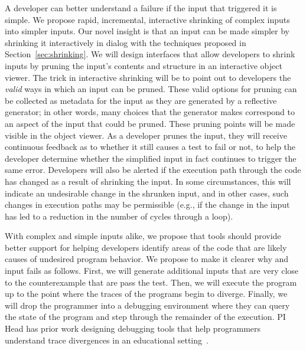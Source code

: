A developer can better understand a failure if the input
that triggered it is simple. We propose rapid, incremental,
interactive shrinking of complex inputs into simpler inputs.
Our novel insight is that an input can be made simpler by
shrinking it interactively in dialog with the techniques
proposed in Section~\ref{sec:shrinking}. We will design
interfaces that allow developers to shrink inputs by pruning
the input's contents and structure in an interactive object
viewer. The trick in interactive shrinking will be to point
out to developers the \emph{valid} ways in which an input
can be pruned. These valid options for pruning can be
collected as metadata for the input as they are generated by
a reflective generator; in other words, many choices that
the generator makes correspond to an aspect of the input
that could be pruned. These pruning points will be made
visible in the object viewer. As a developer prunes the
input, they will receive continuous feedback as to whether
it still causes a test to fail or not, to help the developer
determine whether the simplified input in fact continues to
trigger the same error. Developers will also be alerted if
the execution path through the code has changed as a result
of shrinking the input. In some circumstances, this will
indicate an undesirable change in the shrunken input, and in
other cases, such changes in execution paths may be
permissible (e.g., if the change in the input has led to a
reduction in the number of cycles through a loop).

With complex and simple inputs alike, we propose that tools
should provide better support for helping developers
identify areas of the code that are likely causes of
undesired program behavior. We propose to make it clearer
why and input fails as follows. First, we will generate
additional inputs that are very close to the counterexample
that are pass the test. Then, we will execute the program up
to the point where the traces of the programs begin to
diverge. Finally, we will drop the programmer into a
debugging environment where they can query the state of the
program and step through the remainder of the execution. PI
Head has prior work designing debugging tools that help
programmers understand trace divergences in an educational
setting~\cite{suzuki2017tracediff}.   

